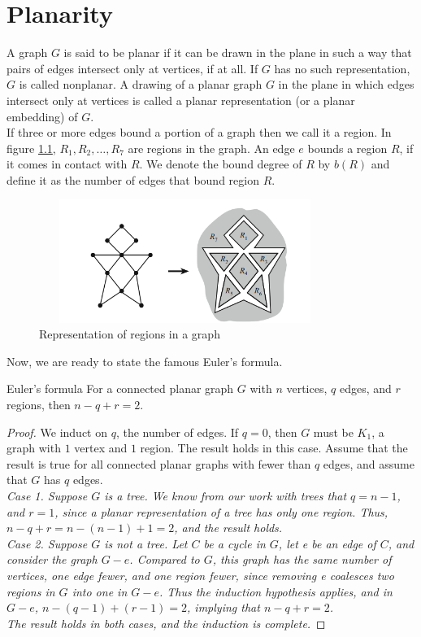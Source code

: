 \documentclass[../basic_graph_theory.tex]{subfiles}
\begin{document}
\chapter{Planarity}
\setcounter{chapter}{6} %
\setcounter{section}{0}
\setcounter{equation}{0}
\setcounter{figure}{0}

A graph $G$ is said to be planar if it can be drawn in the plane in such a way that pairs of edges intersect only at vertices, if at all. If $G$ has no such representation, $G$ is called nonplanar. A drawing of a planar graph $G$ in the plane in which edges intersect only at vertices is called a planar representation (or a planar embedding) of $G$.\\

If three or more edges bound a portion of a graph then we call it a region. In figure \ref{ref:regions}, $R_1, R_2, \dots, R_7$ are regions in the graph. An edge $e$ bounds a region $R$, if it comes in contact with $R$. We denote the bound degree of $R$ by $b(R)$ and define it as the number of edges that bound region $R$.

\begin{figure}[hbt!]
    \label{ref:regions}
    \centering
    \includegraphics[height=4cm,width=9.5cm]{images/region.png}
    \caption{Representation of regions in a graph}
\end{figure}

Now, we are ready to state the famous Euler's formula.
\begin{Thm}{Euler's formula}{}
    For a connected planar graph $G$ with $n$ vertices, $q$ edges, and $r$ regions, then $n-q+r=2$.
\end{Thm}{}{}
\begin{proof}
    We induct on $q$, the number of edges. If $q = 0$, then $G$ must be $K_1$, a graph with $1$ vertex and $1$ region. The result holds in this case. Assume that the result is true for all connected planar graphs with fewer than $q$ edges, and assume that $G$ has $q$ edges.\\
    \em{Case 1.} Suppose $G$ is a tree. We know from our work with trees that $q = n-1$, and $r = 1$, since a planar representation of a tree has only one region. Thus, $n - q + r = n - (n - 1) + 1 = 2$, and the result holds.\\
    \em{Case 2.} Suppose $G$ is not a tree. Let $C$ be a cycle in $G$, let e be an edge of $C$, and consider the graph $G - e$. Compared to $G$, this graph has the same number of vertices, one edge fewer, and one region fewer, since removing e coalesces two regions in $G$ into one in $G - e$. Thus the induction hypothesis applies, and in $G - e$, $n - (q - 1) + (r - 1) = 2$, implying that $n - q + r = 2$.\\
    The result holds in both cases, and the induction is complete.
\end{proof}
\end{document}
